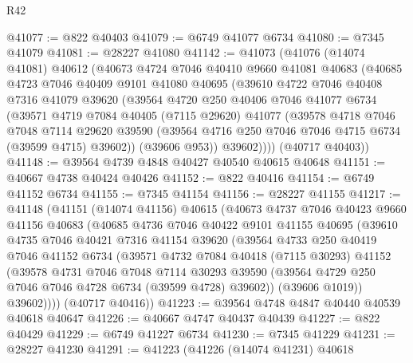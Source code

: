 \begin{lexlean}{R42}
\begin{coremodule}
{@41077 := @822 @40403
@41079 := @6749 @41077 @6734
@41080 := @7345 @41079
@41081 := @28227 @41080
@41142 := @41073
    (@41076
      (@14074 @41081)
      @40612
      (@40673
        @4724
        @7046
        @40410
        @9660
        @41081
        @40683
        (@40685
          @4723
          @7046
          @40409
          @9101
          @41080
          @40695
          (@39610
            @4722
            @7046
            @40408
            @7316
            @41079
            @39620
            (@39564
              @4720
              @250
              @40406
              @7046
              @41077
              @6734
              (@39571
                @4719
                @7084
                @40405
                (@7115 @29620)
                @41077
                (@39578
                  @4718
                  @7046
                  @7048
                  @7114
                  @29620
                  @39590
                  (@39564 @4716 @250 @7046 @7046 @4715 @6734 (@39599 @4715) @39602))
                (@39606 @953))
              @39602))))
      (@40717 @40403))
@41148 := @39564 @4739 @4848 @40427 @40540 @40615 @40648
@41151 := @40667 @4738 @40424 @40426
@41152 := @822 @40416
@41154 := @6749 @41152 @6734
@41155 := @7345 @41154
@41156 := @28227 @41155
@41217 := @41148
    (@41151
      (@14074 @41156)
      @40615
      (@40673
        @4737
        @7046
        @40423
        @9660
        @41156
        @40683
        (@40685
          @4736
          @7046
          @40422
          @9101
          @41155
          @40695
          (@39610
            @4735
            @7046
            @40421
            @7316
            @41154
            @39620
            (@39564
              @4733
              @250
              @40419
              @7046
              @41152
              @6734
              (@39571
                @4732
                @7084
                @40418
                (@7115 @30293)
                @41152
                (@39578
                  @4731
                  @7046
                  @7048
                  @7114
                  @30293
                  @39590
                  (@39564 @4729 @250 @7046 @7046 @4728 @6734 (@39599 @4728) @39602))
                (@39606 @1019))
              @39602))))
      (@40717 @40416))
@41223 := @39564 @4748 @4847 @40440 @40539 @40618 @40647
@41226 := @40667 @4747 @40437 @40439
@41227 := @822 @40429
@41229 := @6749 @41227 @6734
@41230 := @7345 @41229
@41231 := @28227 @41230
@41291 := @41223
    (@41226
      (@14074 @41231)
      @40618
}
\end{coremodule}
\end{lexlean}
